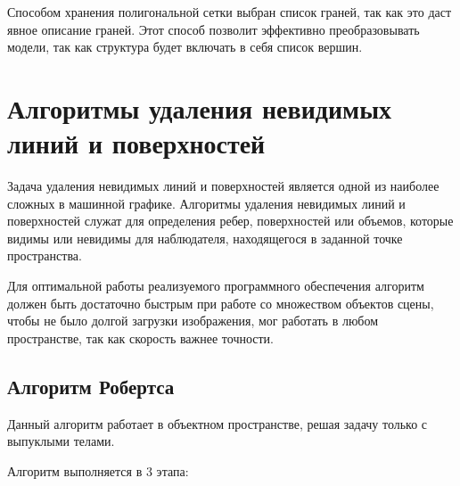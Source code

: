 Способом хранения полигональной сетки выбран список граней, так как это даст явное описание граней. 
Этот способ позволит эффективно преобразовывать модели, так как структура будет включать в себя список вершин.

\section{Алгоритмы удаления невидимых линий и поверхностей}

Задача удаления невидимых линий и поверхностей является одной из наиболее сложных в
машинной графике. Алгоритмы удаления невидимых линий и поверхностей служат для
определения ребер, поверхностей или объемов, которые видимы или невидимы для
наблюдателя, находящегося в заданной точке пространства.

Для оптимальной работы реализуемого программного обеспечения алгоритм должен быть
достаточно быстрым при работе со множеством объектов сцены, чтобы не было долгой загрузки
изображения, мог работать в любом пространстве, так как скорость важнее точности.

\subsection{Алгоритм Робертса}

Данный алгоритм работает в объектном пространстве, решая задачу только с выпуклыми телами.

Алгоритм выполняется в 3 этапа:

